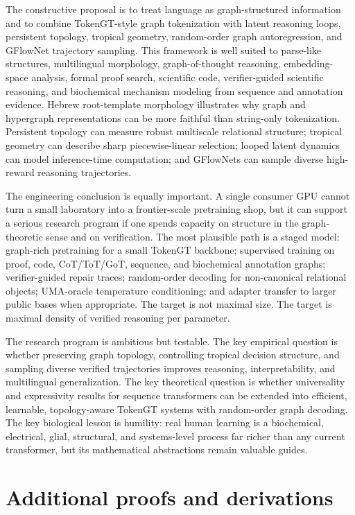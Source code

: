 \documentclass[11pt]{article}
\newcommand{\1}{\mathbf{1}}
\begin{document}
The constructive proposal is to treat language as graph-structured information and to combine TokenGT-style graph tokenization with latent reasoning loops, persistent topology, tropical geometry, random-order graph autoregression, and GFlowNet trajectory sampling. This framework is well suited to parse-like structures, multilingual morphology, graph-of-thought reasoning, embedding-space analysis, formal proof search, scientific code, verifier-guided scientific reasoning, and biochemical mechanism modeling from sequence and annotation evidence. Hebrew root-template morphology illustrates why graph and hypergraph representations can be more faithful than string-only tokenization. Persistent topology can measure robust multiscale relational structure; tropical geometry can describe sharp piecewise-linear selection; looped latent dynamics can model inference-time computation; and GFlowNets can sample diverse high-reward reasoning trajectories.

The engineering conclusion is equally important. A single consumer GPU cannot turn a small laboratory into a frontier-scale pretraining shop, but it can support a serious research program if one spends capacity on structure in the graph-theoretic sense and on verification. The most plausible path is a staged model: graph-rich pretraining for a small TokenGT backbone; supervised training on proof, code, CoT/ToT/GoT, sequence, and biochemical annotation graphs; verifier-guided repair traces; random-order decoding for non-canonical relational objects; UMA-oracle temperature conditioning; and adapter transfer to larger public bases when appropriate. The target is not maximal size. The target is maximal density of verified reasoning per parameter.

The research program is ambitious but testable. The key empirical question is whether preserving graph topology, controlling tropical decision structure, and sampling diverse verified trajectories improves reasoning, interpretability, and multilingual generalization. The key theoretical question is whether universality and expressivity results for sequence transformers can be extended into efficient, learnable, topology-aware TokenGT systems with random-order graph decoding. The key biological lesson is humility: real human learning is a biochemical, electrical, glial, structural, and systems-level process far richer than any current transformer, but its mathematical abstractions remain valuable guides.

\appendix
\section{Additional proofs and derivations}
\end{document}
